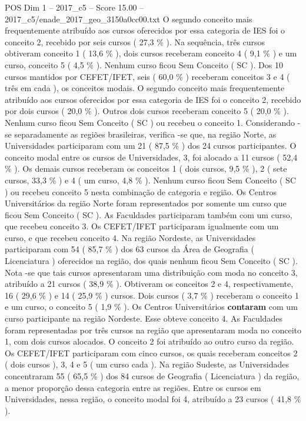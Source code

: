 \begin{textsample}{POS Dim 1 – 2017\_c5 – Score 15.00 – 2017\_c5/enade\_2017\_geo\_3150a0cc00.txt}
O segundo conceito mais frequentemente atribuído aos cursos oferecidos por essa categoria de IES foi o conceito 2, recebido por seis cursos ( 27,3 \% ).
Na sequência, três cursos obtiveram conceito 1 ( 13,6 \% ), dois cursos receberam conceito 4 ( 9,1 \% ) e um curso, conceito 5 ( 4,5 \% ).
Nenhum curso ficou Sem Conceito ( SC ).
Dos 10 cursos mantidos por CEFET/IFET, seis ( 60,0 \% ) receberam conceitos 3 e 4 ( três em cada ), os conceitos modais.
O segundo conceito mais frequentemente atribuído aos cursos oferecidos por essa categoria de IES foi o conceito 2, recebido por dois cursos ( 20,0 \% ).
Outros dois cursos receberam conceito 5 ( 20,0 \% ).
Nenhum curso ficou Sem Conceito ( SC ) ou recebeu o conceito 1.
Considerando -se separadamente as regiões brasileiras, verifica -se que, na região Norte, as Universidades participaram com um 21 ( 87,5 \% ) dos 24 cursos participantes.
O conceito modal entre os cursos de Universidades, 3, foi alocado a 11 cursos ( 52,4 \% ).
Os demais cursos receberam os conceitos 1 ( dois cursos, 9,5 \% ), 2 ( sete cursos, 33,3 \% ) e 4 ( um curso, 4,8 \% ).
Nenhum curso ficou Sem Conceito ( SC ) ou recebeu conceito 5 nesta combinação de categoria e região.
Os Centros Universitários da região Norte foram representados por somente um curso que ficou Sem Conceito ( SC ).
As Faculdades participaram também com um curso, que recebeu conceito 3.
Os CEFET/IFET participaram igualmente com um curso, e que recebeu conceito 4.
Na região Nordeste, as Universidades participaram com 54 ( 85,7 \% ) dos 63 cursos da Área de Geografia ( Licenciatura ) oferecidos na região, dos quais nenhum ficou Sem Conceito ( SC ).
Nota -se que tais cursos apresentaram uma distribuição com moda no conceito 3, atribuído a 21 cursos ( 38,9 \% ).
Obtiveram os conceitos 2 e 4, respectivamente, 16 ( 29,6 \% ) e 14 ( 25,9 \% ) cursos.
Dois cursos ( 3,7 \% ) receberam o conceito 1 e um curso, o conceito 5 ( 1,9 \% ).
Os Centros Universitários \textbf{contaram} com um curso participante na região Nordeste.
Esse obteve conceito 4.
As Faculdades foram representadas por três cursos na região que apresentaram moda no conceito 1, com dois cursos alocados.
O conceito 2 foi atribuído ao outro curso da região.
Os CEFET/IFET participaram com cinco cursos, os quais receberam conceitos 2 ( dois cursos ), 3, 4 e 5 ( um curso cada ).
Na região Sudeste, as Universidades concentraram 55 ( 65,5 \% ) dos 84 cursos de Geografia ( Licenciatura ) da região, a menor proporção dessa categoria entre as regiões.
Entre os cursos em Universidades, nessa região, o conceito modal foi 4, atribuído a 23 cursos ( 41,8 \% ).

\end{textsample}

